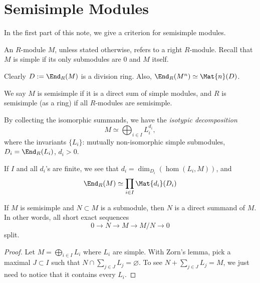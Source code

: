 \documentclass{article}
\begin{document}
\self

\section{Semisimple Modules}

In the first part of this note, we give a criterion for semisimple modules.

\begin{definition}
    An $R$-module $M$, unless stated otherwise, refers to a right $R$-module. Recall that $M$ is simple if its only submodules are $0$ and $M$ itself.
\end{definition} 

Clearly $D:=\End_R(M)$ is a division ring. Also, $\End_R(M^n)\simeq\Mat{n}(D)$.

\begin{definition}\label{def.semisimple}
    We say $M$ is semisimple if it is a direct sum of simple modules, and $R$ is semisimple (as a ring) if all $R$-modules are semisimple. 
\end{definition}

By collecting the isomorphic summands, we have the \emph{isotypic decomposition}
\begin{equation}
    M\simeq \bigoplus_{i\in I}L_i^{d_i},
\end{equation}
where the invariants $\{L_i\}$: mutually non-isomorphic simple submodules, $D_i=\End_R(L_i)$, $d_i>0$.

If $I$ and all $d_i$'s are finite, we see that $d_i=\dim_{D_i}(\hom(L_i,M))$, and
\begin{equation}\label{eq.ssring}
    \End_R (M)\simeq\prod_{i\in I}\Mat{d_i}(D_i)
\end{equation}

\begin{lemma}
    If $M$ is semisimple and $N\subset M$ is a submodule, then $N$ is a direct summand of $M$. 
    In other words, all short exact sequences
    \begin{equation*}
        0 \longrightarrow N \longrightarrow M \longrightarrow M/N \longrightarrow 0
    \end{equation*}
    split.
\end{lemma} 

\begin{proof}
    Let $M=\bigoplus_{i\in I}L_i$ where $L_i$ are simple. 
    With Zorn's lemma, pick a maximal $J\subset I$ such that $N\cap \sum_{j\in J}L_j=\varnothing$.
    To see $N+\sum_{j\in J}L_j=M$, we just need to notice that it contains every $L_i$.
\end{proof}
\end{document}
